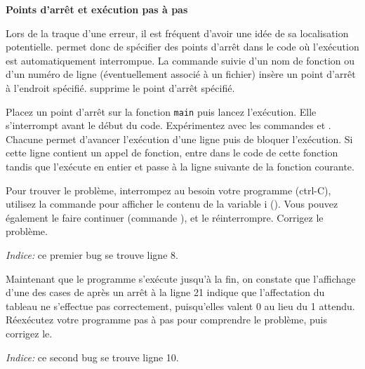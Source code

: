 \documentclass[10pt]{article}\usepackage[nu]{esial}
\begin{document}
\begin{Exercice}
  \smallskip
  \noindent \textbf{Points d'arrêt et exécution pas à pas}

  Lors de la traque d'une erreur, il est fréquent d'avoir une idée de sa
  localisation potentielle.  permet donc de spécifier des points
  d'arrêt dans le code où l'exécution est automatiquement interrompue.  La
  commande  suivie d'un nom de fonction ou d'un numéro de ligne
  (éventuellement associé à un fichier) insère un point d'arrêt à l'endroit
  spécifié.  supprime le point d'arrêt spécifié.

  Placez un point d'arrêt sur la fonction \texttt{main} puis lancez
  l'exécution. Elle s'interrompt avant le début du code.  Expérimentez avec les
  commandes  et . Chacune permet d'avancer l'exécution
  d'une ligne puis de bloquer l'exécution.  Si cette ligne contient un appel de
  fonction,  entre dans le code de cette fonction tandis que
   l'exécute en entier et passe à la ligne suivante de la fonction
  courante.

  \Question Pour trouver le problème, interrompez au besoin votre programme
  (ctrl-C), utilisez la commande  pour afficher le contenu de la
  variable i (). Vous pouvez également le faire continuer
  (commande ), et le réinterrompre. Corrigez le problème.

  \textit{Indice:} ce premier bug se trouve ligne 8.

  \Question Maintenant que le programme s'exécute jusqu'à la fin, on constate
  que l'affichage d'une des cases de  après un arrêt à la ligne 21
  indique que l'affectation du tableau ne s'effectue pas correctement,
  puisqu'elles valent 0 au lieu du 1 attendu. Réexécutez votre programme pas à
  pas pour comprendre le problème, puis corrigez le.

  \textit{Indice:} ce second bug se trouve ligne 10.
\end{Exercice}
\end{document}
